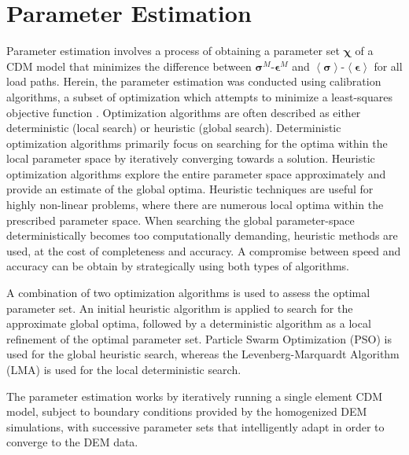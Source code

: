 \section{Parameter Estimation}
Parameter estimation involves a process of obtaining a parameter set $\boldsymbol{\chi}$ of a CDM model that minimizes the difference between $\boldsymbol{\sigma}^M$-$\boldsymbol{\epsilon}^M$ and $\left<\boldsymbol{\sigma}\right>$-$\left<\boldsymbol{\epsilon}\right>$ for all load paths. Herein, the parameter estimation was conducted using calibration algorithms, a subset of optimization which attempts to minimize a least-squares objective function \cite{matott_ostrich:_2008}. Optimization algorithms are often described as either deterministic (local search) or heuristic (global search). Deterministic optimization algorithms primarily focus on searching for the optima within the local parameter space by iteratively converging towards a solution. Heuristic optimization algorithms explore the entire parameter space approximately and provide an estimate of the global optima. Heuristic techniques are useful for highly non-linear problems, where there are numerous local optima within the prescribed parameter space. When searching the global parameter-space deterministically becomes too computationally demanding, heuristic methods are used, at the cost of completeness and accuracy. A compromise between speed and accuracy can be obtain by strategically using both types of algorithms.

A combination of two optimization algorithms is used to assess the optimal parameter set. An initial heuristic algorithm is applied to search for the approximate global optima, followed by a deterministic algorithm as a local refinement of the optimal parameter set. Particle Swarm Optimization (PSO) is used for the global heuristic search, whereas the Levenberg-Marquardt Algorithm (LMA) is used for the local deterministic search. 



The parameter estimation works by iteratively running a single element CDM model, subject to boundary conditions provided by the homogenized DEM simulations, with successive parameter sets that intelligently adapt in order to converge to the DEM data. 
